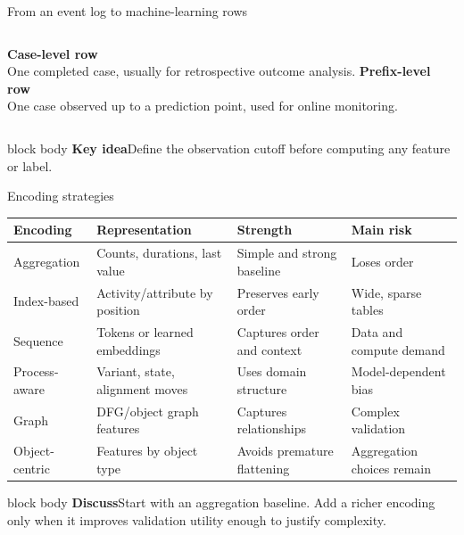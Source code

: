 \documentclass[aspectratio=169,11pt]{beamer}
\newcommand{\keyidea}[1]{%
  \begin{beamercolorbox}[rounded=true,sep=0.65em]{block body}
    \textbf{\color{Teal}Key idea}\quad #1
  \end{beamercolorbox}
}
\newcommand{\promptbox}[1]{%
  \begin{beamercolorbox}[rounded=true,sep=0.65em]{block body}
    \textbf{\color{Coral}Discuss}\quad #1
  \end{beamercolorbox}
}
\begin{document}
\begin{frame}{From an event log to machine-learning rows}
  \centering
  \vspace{0.6cm}
  \begin{columns}[T,onlytextwidth]
      \textbf{Case-level row}\\One completed case, usually for retrospective
      outcome analysis.
      \textbf{Prefix-level row}\\One case observed up to a prediction point,
      used for online monitoring.
  \end{columns}
  \vspace{0.35cm}
  \keyidea{Define the observation cutoff before computing any feature or label.}
\end{frame}

\begin{frame}{Encoding strategies}
  \scriptsize
  \begin{tabular}{@{}
    >{\raggedright\arraybackslash}p{}
    >{\raggedright\arraybackslash}p{}
    >{\raggedright\arraybackslash}p{}
    >{\raggedright\arraybackslash}p{}@{}}
    \toprule
    Encoding & Representation & Strength & Main risk\\
    \midrule
    Aggregation & Counts, durations, last value & Simple and strong baseline & Loses order\\
    Index-based & Activity/attribute by position & Preserves early order & Wide, sparse tables\\
    Sequence & Tokens or learned embeddings & Captures order and context & Data and compute demand\\
    Process-aware & Variant, state, alignment moves & Uses domain structure & Model-dependent bias\\
    Graph & DFG/object graph features & Captures relationships & Complex validation\\
    Object-centric & Features by object type & Avoids premature flattening & Aggregation choices remain\\
    \bottomrule
  \end{tabular}
  \vspace{0.45cm}
  \promptbox{Start with an aggregation baseline. Add a richer encoding only when
  it improves validation utility enough to justify complexity.}
\end{frame}
\end{document}
